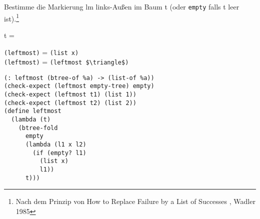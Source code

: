 Bestimme die Markierung lm links-Au\ss en im Baum t (oder \lstinline|empty| falls t leer ist).\footnote{Nach dem Prinzip von \glqq How to Replace Failure by a List of Successes \grqq, Wadler 1985}
\begin{minipage}[c]{0.25\textwidth}
t = 
\end{minipage}%
\begin{minipage}[c]{0.75\textwidth}
\lstinline|(leftmost|\lstinline|)| = \lstinline|(list x)|\\
\lstinline|(leftmost|\lstinline|)| = \lstinline[mathescape]|(leftmost $\triangle$)|
\end{minipage}
\begin{lstlisting}[literate={}]
(: leftmost (btree-of %a) -> (list-of %a))
(check-expect (leftmost empty-tree) empty)
(check-expect (leftmost t1) (list 1))
(check-expect (leftmost t2) (list 2))
(define leftmost
  (lambda (t)
    (btree-fold
      empty
      (lambda (l1 x l2)
        (if (empty? l1)
          (list x)
          l1))
      t)))
\end{lstlisting}
